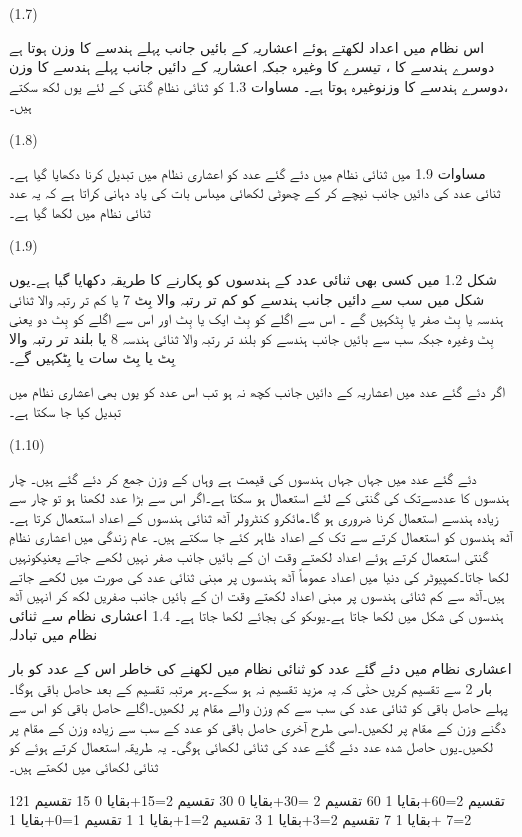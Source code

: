  
(1.7)

	اس نظام میں اعداد لکھتے ہوئے اعشاریہ کے بائیں جانب پہلے ہندسے کا وزن   ہوتا ہے  دوسرے  ہندسے کا   ، تیسرے کا   وغیرہ جبکہ اعشاریہ کے دائیں جانب پہلے ہندسے کا وزن  ،دوسرے ہندسے کا وزنوغیرہ ہوتا ہے۔
	مساوات 1.3 کو ثنائی نظامِ گنتی کے لئے یوں لکھ سکتے ہیں۔

 
(1.8)

	مساوات 1.9 میں ثنائی نظام میں دئے گئے عدد کو اعشاری نظام میں تبدیل کرنا دکھایا گیا ہے۔ ثنائی عدد کی دائیں جانب نیچے کر کے چھوٹی لکھائی میںاس بات کی یاد دہانی کراتا ہے کہ یہ عدد ثنائی نظام میں لکھا گیا ہے۔ 

 
(1.9)

	شکل 1.2 میں کسی بھی ثنائی عدد کے ہندسوں کو پکارنے کا طریقہ دکھایا گیا ہے۔یوں شکل میں سب سے دائیں جانب ہندسے کو کم تر رتبہ والا بِٹ  7 یا کم تر رتبہ والا ثنائی ہندسہ یا بِٹ صفر یا بِٹکہیں گے ۔ اس سے اگلے کو بِٹ ایک یا بِٹ اور اس سے اگلے کو بِٹ دو یعنی بِٹ وغیرہ جبکہ سب سے بائیں جانب ہندسے کو بلند تر رتبہ والا ثنائی ہندسہ 8 یا بلند تر رتبہ والا بِٹ یا بِٹ سات یا بِٹکہیں گے۔


	اگر دئے گئے عدد میں اعشاریہ کے دائیں جانب کچھ نہ ہو تب اس عدد کو یوں بھی اعشاری نظام میں تبدیل کیا جا سکتا ہے۔

 
(1.10)

دئے گئے عدد میں جہاں جہاں ہندسوں کی قیمت  ہے وہاں کے وزن جمع کر دئے گئے ہیں۔
	چار ہندسوں کا عددسےتک کی گنتی کے لئے استعمال ہو سکتا ہے۔اگر اس سے بڑا عدد لکھنا ہو تو چار سے زیادہ ہندسے استعمال کرنا ضروری ہو گا۔مائکرو کنٹرولر آٹھ ثنائی ہندسوں کے اعداد استعمال کرتا ہے۔ آٹھ ہندسوں کو استعمال کرتے سے  تک کے اعداد ظاہر کئے جا سکتے ہیں۔
	عام زندگی میں اعشاری نظامِ گنتی استعمال کرتے ہوئے اعداد لکھتے وقت ان کے بائیں جانب صفر نہیں لکھے جاتے یعنیکونہیں لکھا جاتا۔کمپیوٹر کی دنیا میں اعداد عموماً آٹھ ہندسوں پر مبنی ثنائی عدد کی صورت میں لکھے جاتے ہیں۔آٹھ سے کم ثنائی ہندسوں پر مبنی اعداد لکھتے وقت ان کے بائیں جانب صفریں لکھ کر انہیں آٹھ ہندسوں کی شکل میں لکھا جاتا ہے۔یوںکو کی بجائے لکھا جاتا ہے۔
1.4 اعشاری نظام سے ثنائی نظام میں تبادلہ

	اعشاری نظام میں دئے گئے عدد کو ثنائی نظام میں لکھنے کی خاطر اس کے عدد کو بار بار 2 سے تقسیم کریں حتٰی کہ یہ مزید تقسیم نہ ہو سکے۔ہر مرتبہ تقسیم کے بعد حاصل باقی ہوگا۔پہلے حاصل باقی کو ثنائی عدد کی سب سے کم وزن والے مقام پر لکھیں۔اگلے حاصل باقی کو اس سے دگنے وزن کے مقام پر لکھیں۔اسی طرح آخری حاصل باقی کو عدد کے سب سے زیادہ وزن کے مقام پر لکھیں۔یوں حاصل شدہ عدد دئے گئے عدد کی ثنائی لکھائی ہوگی۔
	یہ طریقہ استعمال کرتے ہوئے کو ثنائی لکھائی میں لکھتے ہیں۔
	
121 تقسیم 2=60+بقایا 1
60 تقسیم 2 =30+بقایا 0
30 تقسیم 2=15+بقایا 0
15 تقسیم 2=7 +بقایا 1
7 تقسیم 2=3+بقایا 1
3 تقسیم 2=1+بقایا 1
1 تقسیم 1=0+بقایا 1

